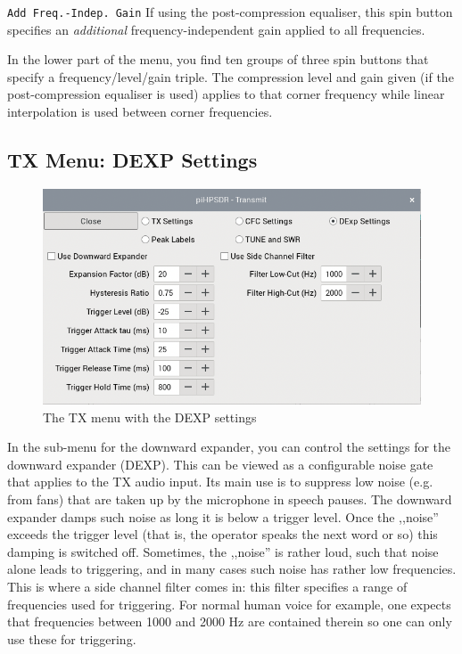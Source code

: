 \documentclass[12pt]{book}
\def\rett#1{\texttt{\color{red}#1}}
\begin{document}
\rett{Add Freq.-Indep. Gain} If using the post-compression equaliser, this spin button specifies an
\textit{additional} frequency-independent gain applied to all frequencies.

In the lower part of the menu, you find ten groups of three spin buttons that specify a frequency/level/gain
triple. The compression level and gain given (if the post-compression equaliser is used) applies to that
corner frequency while linear interpolation is used between corner frequencies.

\subsection{TX Menu: DEXP Settings}
\label{sec:dexp}

\begin{figure}[ht]
\center
\includegraphics[scale=0.45]{TX_DEXP.png}
\caption{The TX menu with the DEXP settings}
\label{fig:DEXPmenu}
\end{figure}

In the sub-menu for the downward expander, you can control the settings for the downward expander
(DEXP). This can be viewed
as a configurable noise gate that applies to the TX audio input. Its main use is to suppress low noise
(e.g. from fans) that are taken up  by the microphone in speech pauses. The downward expander damps
such noise as long it is below a trigger level. Once the ,,noise'' exceeds the trigger level (that is,
the  operator speaks the next word or so) this damping is switched off. Sometimes, the ,,noise'' is
rather loud, such that noise alone leads to triggering, and in many cases such noise has rather low
frequencies. This is where a side channel filter comes in: this filter specifies a range of frequencies
used for triggering. For normal human voice for example, one expects that frequencies between 1000 and
2000 Hz are contained therein so one can only use these for triggering.
\end{document}
